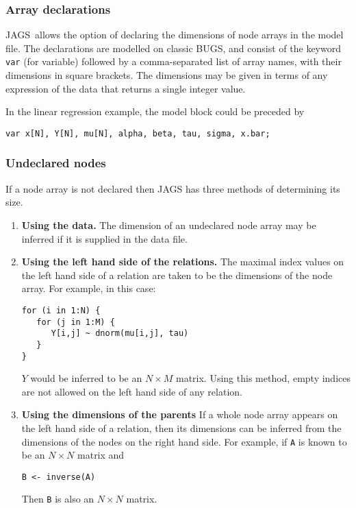 \documentclass[11pt, a4paper, titlepage]{report}
\newcommand{\JAGS}{\textsf{JAGS}}
\newcommand{\BUGS}{\textsf{BUGS}}
\begin{document}
\subsubsection*{Array declarations}

\JAGS\ allows the option of declaring the dimensions of node arrays in
the model file. The declarations are modelled on classic \BUGS, and
consist of the keyword \texttt{var} (for variable) followed by a
comma-separated list of array names, with their dimensions in
square brackets. The dimensions may be given in terms of any
expression of the data that returns a single integer value.

In the linear regression example, the model block could be preceded by
\begin{verbatim}
var x[N], Y[N], mu[N], alpha, beta, tau, sigma, x.bar;
\end{verbatim}

\subsubsection*{Undeclared nodes}

If a node array is not declared then JAGS has three methods of
determining its size.
\begin{enumerate}
\item {\bf Using the data.}  The dimension of an undeclared node array
  may be inferred if it is supplied in the data file.
\item {\bf Using the left hand side of the relations.}  The maximal
  index values on the left hand side of a relation are taken to be the
  dimensions of the node array.  For example, in this case:
\begin{verbatim}
for (i in 1:N) {
   for (j in 1:M) {
      Y[i,j] ~ dnorm(mu[i,j], tau)
   }
}
\end{verbatim}
$Y$ would be inferred to be an $N \times M$ matrix. Using this method,
empty indices are not allowed on the left hand side of any relation.
\item {\bf Using the dimensions of the parents} If a whole node array
  appears on the left hand side of a relation, then its dimensions can
  be inferred from the dimensions of the nodes on the right hand side.
  For example, if \verb+A+ is known to be an $N \times N$ matrix
  and
\begin{verbatim}
B <- inverse(A)
\end{verbatim}
Then \verb+B+ is also an $N \times N$ matrix.
\end{enumerate}
\end{document}
